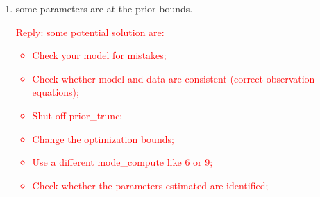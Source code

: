 \documentclass[10pt,math=newtx,citestyle=gb7714-2015,bibstyle=gb7714-2015]{elegantbook}
\begin{document}
{{{\begin{enumerate}
		\textcolor{red}{Reply: In Dynare we do not use the Hessian matrices returned by the optimizers. For instance, mode\_compute=4, the default algorithm derived from Chris Sims code, returns a crude estimate of the Hessian that is not used by Dynare (see any presentation of the BFGS, there is nice page on wikipedia, algorithm which is close to what is done here). Instead we compute the Hessian with finite difference (expect mode\_compute=6 and mode\_compute=5 which uses a gradient the outer product approach), by calling hessian.m function.\\
			The main culprit is that the optimization routine failed in finding a (local) minimum of minus the likelihood (or posterior kernel). That's why you need to play with other optimization routine and/or the initial guesses. Another culprit, may be the noise in the objective function. In this case you have to change the length of the steps in the finite difference routine (controlled by options\_.gstep).\\
			Two additional issue are:
			\begin{itemize}
				\item the Hessian only needs to be positive definite at an interior solution. If you have a corner solution, i.e. you are at the bound of your prior parameter space, there will be a problem.
				\item if a parameter is not identified or if there is collinearity in the jacobian of the likelihood, the Hessian will also be non-positive definite.\\
				That is why a look at the mode\_check plots is often revealing to see many pathological issues simply due to the finite difference approximation to the Hessian.
			\end{itemize}
		}
		\item some parameters are at the prior bounds.\\
		\textcolor{red}{Reply: some potential solution are:
			\begin{itemize}
				\item Check your model for mistakes;
				\item Check whether model and data are consistent (correct observation equations);
				\item Shut off prior\_trunc;
				\item Change the optimization bounds;
				\item Use a different mode\_compute like 6 or 9;
				\item Check whether the parameters estimated are identified;

\end{itemize}}
\end{enumerate}}}}
\end{document}
